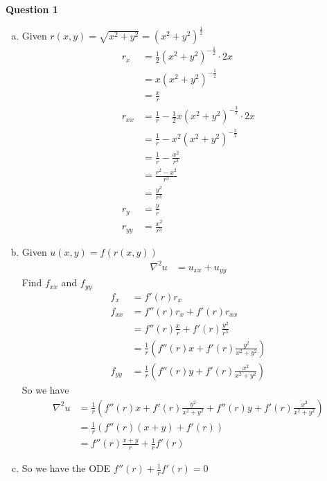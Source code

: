 \documentclass[12pt, letterpaper]{article}
\begin{document}
\graphicspath{ {./} }


\noindent \textbf{Question 1}
\begin{enumerate}[(a)]
    \item Given $r(x,y) = \sqrt{x^2+y^2} = (x^2+y^2)^\frac{1}{2}$
    \begin{align*}
        r_x &= \frac{1}{2}(x^2+y^2)^{-\frac{1}{2}}\cdot 2x \\
        &= x(x^2+y^2)^{-\frac 12} \\
        &= \frac xr \\
        r_{xx} &= \frac 1r - \frac 12 x(x^2+y^2)^{-\frac 32} \cdot 2x \\
        &= \frac 1r - x^2(x^2+y^2)^{-\frac 32} \\
        &= \frac 1r - \frac {x^2}{r^3} \\
        &= \frac{r^2-x^2}{r^3} \\
        &= \frac{y^2}{r^3}\\
        r_y &= \frac yr \\ 
        r_{yy} &= \frac{x^2}{r^3}
    \end{align*}
    \item Given $u(x,y) = f(r(x,y))$
    \begin{align*}
        \nabla^2 u &= u_{xx} + u_{yy} 
    \end{align*}
    Find $f_{xx}$ and $f_{yy}$
    \begin{align*}
        f_x &= f'(r)r_x \\
        f_{xx} &= f''(r)r_x + f'(r)r_{xx} \\
        &= f''(r)\frac xr + f'(r)\frac{y^2}{r^3} \\
        &= \frac 1r \left(f''(r)x + f'(r)\frac{y^2}{x^2 + y^2}\right) \\
        f_{yy} &= \frac 1r \left(f''(r)y + f'(r)\frac{x^2}{x^2 + y^2}\right)
    \end{align*}
    So we have
    \begin{align*}
        \nabla^2 u &= \frac 1r \left(f''(r)x + f'(r)\frac{y^2}{x^2 + y^2} + f''(r)y + f'(r)\frac{x^2}{x^2 + y^2} \right) \\
        &= \frac 1r \left( f''(r)(x+y)+f'(r)\right) \\
        &= f''(r) \frac{x+y}{r} + \frac 1r f'(r)
    \end{align*}
    \item So we have the ODE $\displaystyle f''(r) + \frac 1r f'(r) = 0$

\end{enumerate}
\end{document}
